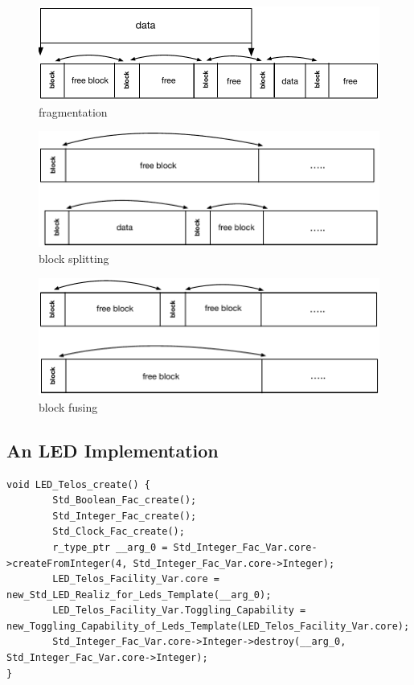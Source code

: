 \begin{figure}[!htb]
\centering
\includegraphics[scale=.55]{figs/fragmentation.pdf}
\caption{fragmentation}
\end{figure}
\label{fig:fragmentation}

\begin{figure}[!htb]
\centering
\includegraphics[scale=.55]{figs/split.pdf}
\caption{block splitting}
\end{figure}
\label{fig:split}

\begin{figure}[!htb]
\centering
\includegraphics[scale=.55]{figs/fuse.pdf}
\caption{block fusing}
\end{figure}
\label{fig:fuse}

\subsection{An LED Implementation}

\begin{verbatim}
void LED_Telos_create() {
		Std_Boolean_Fac_create();
		Std_Integer_Fac_create();
		Std_Clock_Fac_create();
		r_type_ptr __arg_0 = Std_Integer_Fac_Var.core->createFromInteger(4, Std_Integer_Fac_Var.core->Integer);
		LED_Telos_Facility_Var.core = new_Std_LED_Realiz_for_Leds_Template(__arg_0);
		LED_Telos_Facility_Var.Toggling_Capability = new_Toggling_Capability_of_Leds_Template(LED_Telos_Facility_Var.core);
		Std_Integer_Fac_Var.core->Integer->destroy(__arg_0, Std_Integer_Fac_Var.core->Integer);
}
\end{verbatim}